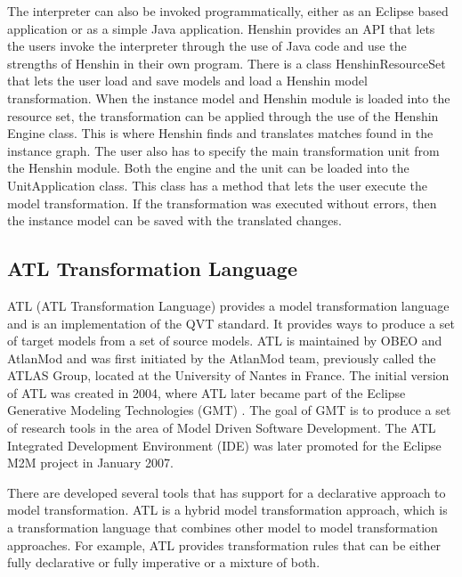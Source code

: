 The interpreter can also be invoked programmatically, either as an
Eclipse based application or as a simple Java application. Henshin provides an
API that lets the users invoke the interpreter through the use of Java code and
use the strengths of Henshin in their own program. There is a class
HenshinResourceSet that lets the user load and save models and
load a Henshin model transformation. When the instance model and Henshin module
is loaded into the resource set, the transformation can be applied through the
use of the Henshin Engine class. This is where Henshin finds and translates
matches found in the instance graph. The user also has to specify the main
transformation unit from the Henshin module. Both the engine and the unit can be
loaded into the UnitApplication class. This class has a method that lets the
user execute the model transformation. If the transformation was executed
without errors, then the instance model can be saved with the translated
changes.

\subsection{ATL Transformation Language}

ATL\cite{Jouault2008} (ATL Transformation Language) provides a model transformation
language and is an implementation of the QVT\cite{QVT} standard. It
provides ways to produce a set of target models from a set of source models.
ATL is maintained by OBEO\cite{OBEO} and AtlanMod\cite{ATLANMod} and was first
initiated by the AtlanMod team, previously called the ATLAS Group, located at
the University of Nantes in France. The initial version of ATL was created in
2004, where ATL later became part of the Eclipse Generative Modeling
Technologies (GMT) \cite{GMT}. The goal of GMT is to produce a set of research tools in the
area of Model Driven Software Development. The ATL Integrated Development
Environment (IDE) was later promoted for the Eclipse M2M project in January
2007.

There are developed several tools that has support for a declarative
approach to model transformation. ATL is a hybrid model transformation
approach, which is a transformation language that combines other model to model
transformation approaches. For example, ATL provides transformation rules that
can be either fully declarative or fully imperative or a mixture of both. 

